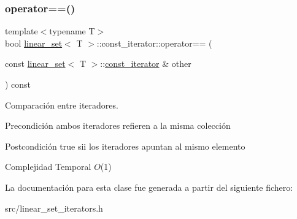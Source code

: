 \subsubsection{\texorpdfstring{operator==()}{operator==()}}
{\footnotesize\ttfamily template$<$typename T$>$ \\
bool \mbox{\hyperlink{classlinear__set}{linear\+\_\+set}}$<$ T $>$\+::const\+\_\+iterator\+::operator== (\begin{DoxyParamCaption}\item[{const \mbox{\hyperlink{classlinear__set}{linear\+\_\+set}}$<$ T $>$\+::\mbox{\hyperlink{classlinear__set_1_1const__iterator}{const\+\_\+iterator}} \&}]{other }\end{DoxyParamCaption}) const}



Comparación entre iteradores. 

\begin{DoxyPrecond}{Precondición}
ambos iteradores refieren a la misma colección 
\end{DoxyPrecond}
\begin{DoxyPostcond}{Postcondición}
true sii los iteradores apuntan al mismo elemento
\end{DoxyPostcond}

\begin{DoxyDescription}
\item[Complejidad Temporal]$O$(1)
\end{DoxyDescription}

La documentación para esta clase fue generada a partir del siguiente fichero\+:\begin{DoxyCompactItemize}
\item 
src/linear\+\_\+set\+\_\+iterators.\+h\end{DoxyCompactItemize}
